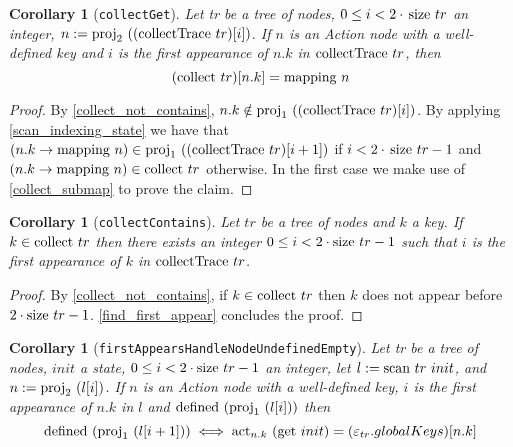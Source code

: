 \documentclass{article}
\newtheorem{corollary}[lemma]{Corollary}
\newcommand{\textfun}[1]{\textup{#1}}
\newcommand{\textcode}[1]{\texttt{#1}}
\newcommand{\scan}[2]{\textfun{scan}\ #1\ #2}
\newcommand{\collect}[1]{\textfun{collect}\ #1}
\newcommand{\collectTr}[1]{\textfun{collectTrace}\ #1}
\newcommand{\defined}[1]{\textfun{defined}\ #1}
\newcommand{\get}[1]{\textfun{get}\ #1}
\newcommand{\mapping}[1]{\textfun{mapping}\ #1}
\newcommand{\size}[1]{\textfun{size}\ #1}
\newcommand{\fst}[1]{\textfun{proj}_1\ #1}
\newcommand{\snd}[1]{\textfun{proj}_2\ #1}
\newcommand{\actkey}[2]{\textfun{act}_{#1}\ #2}
\newcommand{\emptyState}[1]{\varepsilon_{#1}}
\begin{document}
\begin{corollary}[\textcode{collectGet}]
    \label{first_mapping}
    Let tr be a tree of nodes, $0 \leq i < 2 \cdot \, \size{tr}$ an integer, 
    $n := \snd{((\collectTr{tr})[i])}$. If $n$ is an Action node with a well-defined key and $i$ is the first appearance of $n.k$ in $\collectTr{tr}$, then
    \[(\collect{tr})[n.k] = \mapping{n}\] 
\end{corollary}
    
\begin{proof}
    By \cref{collect_not_contains}, $n.k \notin \fst{((\collectTr{tr})[i])}$. By applying \cref{scan_indexing_state} we have that $(n.k \to \mapping{n}) \in \fst{((\collectTr{tr})[i + 1])}$
    if $i < 2 \cdot \, \size{tr} - 1$ and $(n.k \to \mapping{n}) \in \collect{tr}$ otherwise. In the first case we make use of \cref{collect_submap} to prove the claim.
\end{proof}

\begin{corollary}[\textcode{collectContains}]
    \label{find_k_first_appear}
    Let $tr$ be a tree of nodes and  $k$ a key. If $k \in \collect{tr}$ then there exists an integer $0 \leq  i < 2 \cdot \size{tr} - 1$ such that
    $i$ is the first appearance of $k$ in $\collectTr{tr}$.
\end{corollary}
\begin{proof}
    By \cref{collect_not_contains}, if $k \in \collect{tr}$ then $k$ does not appear before $2 \cdot \size{tr} - 1$. \cref{find_first_appear} concludes the proof.
\end{proof}

\begin{corollary}[\textcode{firstAppearsHandleNodeUndefinedEmpty}]
    \label{defined_globalkeys_mapping}
    Let tr be a tree of nodes, $init$ a state, $0 \leq i < 2\cdot \size{tr} - 1$ an integer, let $l := \scan{tr}{init}$, and $n := \snd{(l[i])}$. 
   If $n$ is an Action node with a well-defined key, $i$ is the first appearance of $n.k$ in $l$ and $\defined{(\fst{(l[i])})}$ then 
   \[\defined{(\fst{(l[i + 1])})} \iff \actkey{n.k}{(\get{init})} = (\emptyState{tr}.globalKeys)[n.k]\]
\end{corollary}
\end{document}
